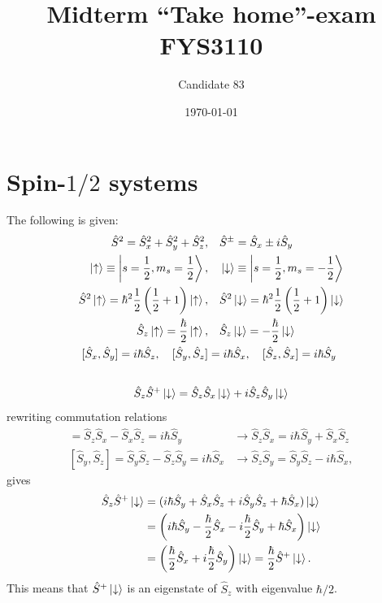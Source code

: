 \documentclass{article}
\title{Midterm ``Take home''-exam\\
		\large{FYS3110}}
\author{Candidate 83}
\date{\today}
\begin{document}
\maketitle

\section{Spin-$1/2$ systems}

The following is given:
\begin{align*}
\hat{S}^2 = \hat{S}_x^2+\hat{S}_y^2+\hat{S}_z^2, &\quad
\hat{S}^{\pm}=\hat{S}_x \pm i\hat{S}_y \\
\ket{\uparrow} \equiv \ket{s=\frac{1}{2},m_s=\frac{1}{2}}, &\quad 
\ket{\downarrow} \equiv \ket{s=\frac{1}{2},m_s=-\frac{1}{2}} \\
\hat{S}^2\ket{\uparrow} = \hbar^2\frac{1}{2}\left(\frac{1}{2}+1\right)\ket{\uparrow}, &\quad
\hat{S}^2\ket{\downarrow} = \hbar^2\frac{1}{2}\left(\frac{1}{2}+1\right)\ket{\downarrow} \\
\hat{S}_z\ket{\uparrow} = \frac{\hbar}{2}\ket{\uparrow}, &\quad 
\hat{S}_z\ket{\downarrow} = -\frac{\hbar}{2}\ket{\downarrow} \\
[\hat{S}_x,\hat{S}_y]=i\hbar\hat{S}_z, \quad
[\hat{S}_y,\hat{S}_z]&=i\hbar\hat{S}_x, \quad
[\hat{S}_z,\hat{S}_x]=i\hbar\hat{S}_y 
\end{align*}


\subsection{}
\begin{equation*}
\hat{S}_z\hat{S}^+\ket{\downarrow} = \hat{S}_z\hat{S}_x\ket{\downarrow} + i\hat{S}_z\hat{S}_y\ket{\downarrow}
\end{equation*}
rewriting commutation relations
\begin{align*}
[\hat{S}_z,\hat{S}_x]=\hat{S}_z\hat{S}_x - \hat{S}_x\hat{S}_z =i\hbar\hat{S}_y  &\rightarrow
\hat{S}_z\hat{S}_x = i\hbar\hat{S}_y + \hat{S}_x\hat{S}_z \\
[\hat{S}_y,\hat{S}_z]=\hat{S}_y\hat{S}_z - \hat{S}_z\hat{S}_y =i\hbar\hat{S}_x  &\rightarrow
\hat{S}_z\hat{S}_y = \hat{S}_y\hat{S}_z - i\hbar\hat{S}_x,
\end{align*}
gives
\begin{align*}
\hat{S}_z\hat{S}^+\ket{\downarrow} &=(i\hbar\hat{S}_y+\hat{S}_x\hat{S}_z+i\hat{S}_y\hat{S}_z+\hbar\hat{S}_x)\ket{\downarrow} \\
&= \left(i\hbar\hat{S}_y -\frac{\hbar}{2}\hat{S}_x -i\frac{\hbar}{2}\hat{S}_y + \hbar\hat{S}_x \right) \ket{\downarrow} \\
&=\left(\frac{\hbar}{2}\hat{S}_x + i\frac{\hbar}{2} \hat{S}_y\right)\ket{\downarrow} = \frac{\hbar}{2}\hat{S}^+\ket{\downarrow}.
\end{align*}
This means that $\hat{S}^+\ket{\downarrow}$ is an eigenstate of $\hat{S}_z$ with eigenvalue $\hbar/2$.
\end{document}
